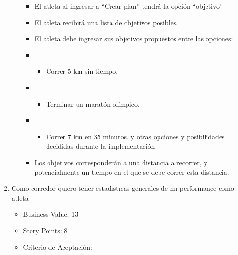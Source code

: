\begin{enumerate}
\begin{itemize}
    \begin{itemize}
    \item
      El atleta al ingresar a ``Crear plan'' tendrá la opción
      ``objetivo''
    \item
      El atleta recibirá una lista de objetivos posibles.
    \item
      El atleta debe ingresar sus objetivos propuestos entre las
      opciones:
    \item
      \begin{itemize}
      \itemsep1pt\parskip0pt
      \item
        Correr 5 km sin tiempo.
      \end{itemize}
    \item
      \begin{itemize}
      \itemsep1pt\parskip0pt
      \item
        Terminar un maratón olímpico.
      \end{itemize}
    \item
      \begin{itemize}
      \itemsep1pt\parskip0pt
      \item
        Correr 7 km en 35 minutos. y otras opciones y posibilidades
        decididas durante la implementación
      \end{itemize}
    \item
      Los objetivos corresponderán a una distancia a recorrer, y
      potencialmente un tiempo en el que se debe correr esta distancia.
    \end{itemize}
  \end{itemize}
\item
  Como corredor quiero tener estadisticas generales de mi performance
  como atleta

  \begin{itemize}
  \itemsep1pt\parskip0pt
  \item
    Business Value: 13
  \item
    Story Points: 8
  \item
    Criterio de Aceptación:


\end{itemize}
\end{enumerate}
